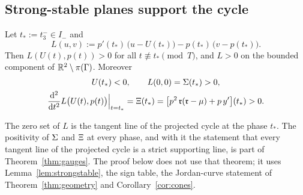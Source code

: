 \subsection{Strong-stable planes support the cycle}
\begin{lemma}\label{wk:lem:line}
Let $t_\ast:=t_3^-\in I_-$ and
\[
L(u,v):=p'(t_\ast)\,\bigl(u-U(t_\ast)\bigr)-p(t_\ast)\,\bigl(v-p(t_\ast)\bigr).
\]
Then $L(U(t),p(t))>0$ for all $t\not\equiv t_\ast\pmod T$, and $L>0$ on the bounded component of $\mathbb R^2\setminus\pi(\Gamma)$. Moreover
\begin{equation}\label{wk:eq:linedata}
\begin{gathered}
U(t_\ast)<0,\qquad L(0,0)=\Sigma(t_\ast)>0,\\
\frac{\mathrm d^2}{\mathrm dt^2}L\bigl(U(t),p(t)\bigr)\Big|_{t=t_\ast}=\Xi(t_\ast)=\bigl[p^2\,\mathfrak r(\mathfrak r-\mu)+p\,y'\bigr](t_\ast)>0 .
\end{gathered}
\end{equation}
\end{lemma}
The zero set of $L$ is the tangent line of the projected cycle at the phase $t_\ast$. The positivity of $\Sigma$ and $\Xi$ at every phase, and with it the statement that every tangent line of the projected cycle is a strict supporting line, is part of Theorem~\ref{thm:gauges}. The proof below does not use that theorem; it uses Lemma~\ref{lem:strongstable}, the sign table, the Jordan-curve statement of Theorem~\ref{thm:geometry} and Corollary~\ref{cor:cones}.
